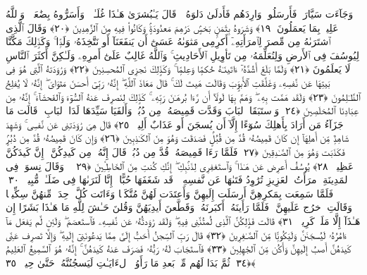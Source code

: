  وَجَآءَت سَيَّارَةٌۭ فَأَرسَلُوا۟ وَارِدَهُم فَأَدلَىٰ دَلوَهُۥ ۖ قَالَ يَـٰبُشرَىٰ هَـٰذَا غُلَـٰمٌۭ ۚ وَأَسَرُّوهُ بِضَٰعَةًۭ ۚ وَٱللَّهُ عَلِيمٌۢ بِمَا يَعمَلُونَ ﴿١٩﴾
 وَشَرَوهُ بِثَمَنٍۭ بَخسٍۢ دَرَٰهِمَ مَعدُودَةٍۢ وَكَانُوا۟ فِيهِ مِنَ ٱلزَّٰهِدِينَ ﴿٢٠﴾
 وَقَالَ ٱلَّذِى ٱشتَرَىٰهُ مِن مِّصرَ لِٱمرَأَتِهِۦٓ أَكرِمِى مَثوَىٰهُ عَسَىٰٓ أَن يَنفَعَنَآ أَو نَتَّخِذَهُۥ وَلَدًۭا ۚ وَكَذَٟلِكَ مَكَّنَّا لِيُوسُفَ فِى ٱلأَرضِ وَلِنُعَلِّمَهُۥ مِن تَأوِيلِ ٱلأَحَادِيثِ ۚ وَٱللَّهُ غَالِبٌ عَلَىٰٓ أَمرِهِۦ وَلَـٰكِنَّ أَكثَرَ ٱلنَّاسِ لَا يَعلَمُونَ ﴿٢١﴾
 وَلَمَّا بَلَغَ أَشُدَّهُۥٓ ءَاتَينَـٰهُ حُكمًۭا وَعِلمًۭا ۚ وَكَذَٟلِكَ نَجزِى ٱلمُحسِنِينَ ﴿٢٢﴾
 وَرَٰوَدَتهُ ٱلَّتِى هُوَ فِى بَيتِهَا عَن نَّفسِهِۦ وَغَلَّقَتِ ٱلأَبوَٟبَ وَقَالَت هَيتَ لَكَ ۚ قَالَ مَعَاذَ ٱللَّهِ ۖ إِنَّهُۥ رَبِّىٓ أَحسَنَ مَثوَاىَ ۖ إِنَّهُۥ لَا يُفلِحُ ٱلظَّـٰلِمُونَ ﴿٢٣﴾
 وَلَقَد هَمَّت بِهِۦ ۖ وَهَمَّ بِهَا لَولَآ أَن رَّءَا بُرهَـٰنَ رَبِّهِۦ ۚ كَذَٟلِكَ لِنَصرِفَ عَنهُ ٱلسُّوٓءَ وَٱلفَحشَآءَ ۚ إِنَّهُۥ مِن عِبَادِنَا ٱلمُخلَصِينَ ﴿٢٤﴾
 وَٱستَبَقَا ٱلبَابَ وَقَدَّت قَمِيصَهُۥ مِن دُبُرٍۢ وَأَلفَيَا سَيِّدَهَا لَدَا ٱلبَابِ ۚ قَالَت مَا جَزَآءُ مَن أَرَادَ بِأَهلِكَ سُوٓءًا إِلَّآ أَن يُسجَنَ أَو عَذَابٌ أَلِيمٌۭ ﴿٢٥﴾
 قَالَ هِىَ رَٰوَدَتنِى عَن نَّفسِى ۚ وَشَهِدَ شَاهِدٌۭ مِّن أَهلِهَآ إِن كَانَ قَمِيصُهُۥ قُدَّ مِن قُبُلٍۢ فَصَدَقَت وَهُوَ مِنَ ٱلكَـٰذِبِينَ ﴿٢٦﴾
 وَإِن كَانَ قَمِيصُهُۥ قُدَّ مِن دُبُرٍۢ فَكَذَبَت وَهُوَ مِنَ ٱلصَّـٰدِقِينَ ﴿٢٧﴾
 فَلَمَّا رَءَا قَمِيصَهُۥ قُدَّ مِن دُبُرٍۢ قَالَ إِنَّهُۥ مِن كَيدِكُنَّ ۖ إِنَّ كَيدَكُنَّ عَظِيمٌۭ ﴿٢٨﴾
 يُوسُفُ أَعرِض عَن هَـٰذَا ۚ وَٱستَغفِرِى لِذَنۢبِكِ ۖ إِنَّكِ كُنتِ مِنَ ٱلخَاطِـِٔينَ ﴿٢٩﴾
 ۞ وَقَالَ نِسوَةٌۭ فِى ٱلمَدِينَةِ ٱمرَأَتُ ٱلعَزِيزِ تُرَٰوِدُ فَتَىٰهَا عَن نَّفسِهِۦ ۖ قَد شَغَفَهَا حُبًّا ۖ إِنَّا لَنَرَىٰهَا فِى ضَلَـٰلٍۢ مُّبِينٍۢ ﴿٣٠﴾
 فَلَمَّا سَمِعَت بِمَكرِهِنَّ أَرسَلَت إِلَيهِنَّ وَأَعتَدَت لَهُنَّ مُتَّكَـًۭٔا وَءَاتَت كُلَّ وَٟحِدَةٍۢ مِّنهُنَّ سِكِّينًۭا وَقَالَتِ ٱخرُج عَلَيهِنَّ ۖ فَلَمَّا رَأَينَهُۥٓ أَكبَرنَهُۥ وَقَطَّعنَ أَيدِيَهُنَّ وَقُلنَ حَـٰشَ لِلَّهِ مَا هَـٰذَا بَشَرًا إِن هَـٰذَآ إِلَّا مَلَكٌۭ كَرِيمٌۭ ﴿٣١﴾
 قَالَت فَذَٟلِكُنَّ ٱلَّذِى لُمتُنَّنِى فِيهِ ۖ وَلَقَد رَٰوَدتُّهُۥ عَن نَّفسِهِۦ فَٱستَعصَمَ ۖ وَلَئِن لَّم يَفعَل مَآ ءَامُرُهُۥ لَيُسجَنَنَّ وَلَيَكُونًۭا مِّنَ ٱلصَّـٰغِرِينَ ﴿٣٢﴾
 قَالَ رَبِّ ٱلسِّجنُ أَحَبُّ إِلَىَّ مِمَّا يَدعُونَنِىٓ إِلَيهِ ۖ وَإِلَّا تَصرِف عَنِّى كَيدَهُنَّ أَصبُ إِلَيهِنَّ وَأَكُن مِّنَ ٱلجَٰهِلِينَ ﴿٣٣﴾
 فَٱستَجَابَ لَهُۥ رَبُّهُۥ فَصَرَفَ عَنهُ كَيدَهُنَّ ۚ إِنَّهُۥ هُوَ ٱلسَّمِيعُ ٱلعَلِيمُ ﴿٣٤﴾
 ثُمَّ بَدَا لَهُم مِّنۢ بَعدِ مَا رَأَوُا۟ ٱلءَايَـٰتِ لَيَسجُنُنَّهُۥ حَتَّىٰ حِينٍۢ ﴿٣٥﴾

